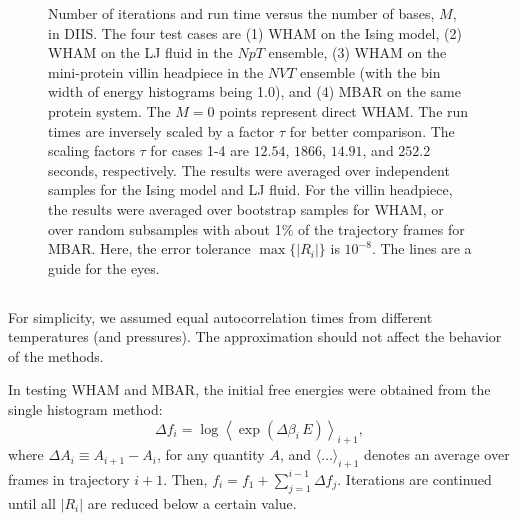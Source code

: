 \documentclass[reprint,aip,jcp,superscriptaddress]{revtex4-1}
\begin{document}
\begin{figure}[h]
  \caption{
    \label{fig:nsnt}
    Number of iterations
    and run time
    versus the number of bases, $M$,
    in DIIS.
    The four test cases are
    (1) WHAM on the Ising model,
    (2) WHAM on the LJ fluid in the $NpT$ ensemble,
    (3) WHAM on the mini-protein villin headpiece in the $NVT$ ensemble
    (with the bin width of energy histograms being 1.0), and
    (4) MBAR on the same protein system.
    The $M = 0$ points represent direct WHAM.
    The run times are inversely scaled
    by a factor $\tau$
    for better comparison.
    The scaling factors $\tau$ for cases 1-4 are
    $12.54$, $1866$, $14.91$, and $252.2$ seconds,
    respectively.
    The results were averaged
    over independent samples
    for the Ising model and LJ fluid.
    For the villin headpiece,
    the results were averaged over
    bootstrap\cite{
    newman, efron1979, hub2010}
    samples for WHAM,
    or over random subsamples with about 1\% of the trajectory frames
    for MBAR.
    Here, the error tolerance
    $\max \{ |R_i| \}$ is $10^{-8}$.
    The lines are a guide for the eyes.
  }
\end{figure}





\subsection{\label{sec:results_setup}
}



For simplicity,
we assumed equal autocorrelation times
from different temperatures (and pressures).
%
The approximation should not affect
the  behavior of the methods.



In testing WHAM and MBAR,
the initial free energies were obtained from
the single histogram method:
%
\begin{equation*}
\Delta f_i
=
\log
\left\langle
  \exp\left(
    \Delta \beta_i \, E
  \right)
\right\rangle_{i+1},
\end{equation*}
%
where $\Delta A_i \equiv A_{i+1} - A_i$,
for any quantity $A$,
and
$\langle\dots\rangle_{i + 1}$
denotes an average over frames in trajectory $i + 1$.
%
Then, $f_i = f_1 + \sum_{j = 1}^{i - 1} \Delta f_j$.
%
%
Iterations are continued
until all $|R_i|$ are reduced
below a certain value.
\end{document}
